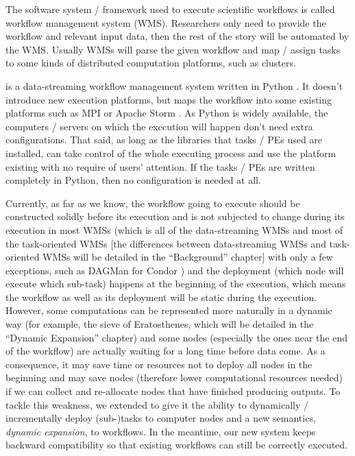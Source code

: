 The software system / framework used to execute scientific workflows is called workflow management system (WMS). Researchers only need to provide the workflow and relevant input data, then the rest of the story will be automated by the WMS. Usually WMSs will parse the given workflow and map / assign tasks to some kinds of distributed computation platforms, such as clusters.

\Dpy is a data-streaming workflow management system written in Python \cite{doi:10.1177/1094342016649766}. It doesn't introduce new execution platforms, but maps the workflow into some existing platforms such as MPI \cite{MPI_forum} or Apache Storm \cite{apache_storm}. As Python is widely available, the computers / servers on which the execution will happen don't need extra configurations. That said, as long as the libraries that tasks / PEs used are installed, \dpy can take control of the whole executing process and use the platform existing with no require of users' attention. If the tasks / PEs are written completely in Python, then no configuration is needed at all.

Currently, as far as we know, the workflow going to execute should be constructed solidly before its execution and is not subjected to change during its execution in most WMSs (which is all of the data-streaming WMSs and most of the task-oriented WMSs [the differences between data-streaming WMSs and task-oriented WMSs will be detailed in the ``Background'' chapter] with only a few exceptions, such as DAGMan for Condor \cite{couvares2007workflow}) and the deployment (\ie which node will execute which sub-task) happens at the beginning of the execution, which means the workflow as well as its deployment will be static during the execution. However, some computations can be represented more naturally in a dynamic way (for example, the sieve of Eratosthenes, which will be detailed in the ``Dynamic Expansion'' chapter) and some nodes (especially the ones near the end of the workflow) are actually waiting for a long time before data come. As a consequence, it may save time or resources not to deploy all nodes in the beginning and may save nodes (therefore lower computational resources needed) if we can collect and re-allocate nodes that have finished producing outputs. To tackle this weakness, we extended \dpy to give it the ability to dynamically / incrementally deploy (sub-)tasks to computer nodes and a new semantics, \emph{dynamic expansion}, to workflows. In the meantime, our new system keeps backward compatibility so that existing workflows can still be correctly executed.

